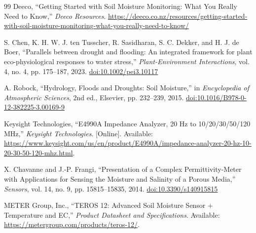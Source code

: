 \begin{thebibliography}{99}
Deeco,
``Getting Started with Soil Moisture Monitoring: What You Really Need to Know,''
\emph{Deeco Resources}.
\href{https://deeco.co.nz/resources/getting-started-with-soil-moisture-monitoring-what-you-really-need-to-know/}
{https://deeco.co.nz/resources/getting-started-with-soil-moisture-monitoring-what-you-really-need-to-know/}

S. Chen, K. H. W. J. ten Tusscher, R. Sasidharan,
S. C. Dekker, and H. J. de Boer,
``Parallels between drought and flooding: An integrated framework for plant eco-physiological responses to water stress,''
\emph{Plant-Environment Interactions},
vol. 4, no. 4, pp. 175--187, 2023.
\href{https://doi.org/10.1002/pei3.10117}
{doi:10.1002/pei3.10117}

A. Robock,
``Hydrology, Floods and Droughts: Soil Moisture,''
in \emph{Encyclopedia of Atmospheric Sciences}, 2nd ed.,
Elsevier, pp. 232--239, 2015.
\href{https://doi.org/10.1016/B978-0-12-382225-3.00169-9}
{doi:10.1016/B978-0-12-382225-3.00169-9}

Keysight Technologies,
``E4990A Impedance Analyzer, 20 Hz to 10/20/30/50/120 MHz,''
\emph{Keysight Technologies}.
[Online]. Available:
\href{https://www.keysight.com/us/en/product/E4990A/impedance-analyzer-20-hz-10-20-30-50-120-mhz.html}
{https://www.keysight.com/us/en/product/E4990A/impedance-analyzer-20-hz-10-20-30-50-120-mhz.html}.

X. Chavanne and J.-P. Frangi,
``Presentation of a Complex Permittivity-Meter with Applications
for Sensing the Moisture and Salinity of a Porous Media,''
\emph{Sensors}, vol. 14, no. 9, pp. 15815--15835, 2014.
\href{https://doi.org/10.3390/s140915815}
{doi:10.3390/s140915815}

METER Group, Inc.,
``TEROS 12: Advanced Soil Moisture Sensor + Temperature and EC,''
\emph{Product Datasheet and Specifications}.
Available: \href{https://metergroup.com/products/teros-12/}
{https://metergroup.com/products/teros-12/}.


\end{thebibliography}
